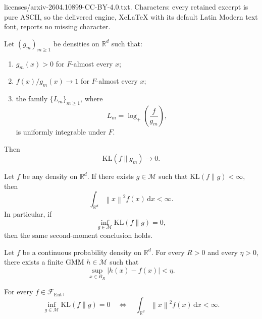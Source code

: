 \documentclass[10pt,a4paper]{amsart}
\begin{document}
licenses/arxiv-2604.10899-CC-BY-4.0.txt. Characters: every retained excerpt is pure ASCII, so the delivered engine, XeLaTeX with its default Latin Modern text font, reports no missing character.
\begin{proposition}
\label{prop:UIKL}
Let $(g_m)_{m\ge1}$ be densities on $\mathbb{R}^d$ such that:
\begin{enumerate}[label=\textnormal{(\roman*)}]
    \item $g_m(x)>0$ for $F$-almost every $x$;
    \item $f(x)/g_m(x)\to1$ for $F$-almost every $x$;
    \item the family $\{L_m\}_{m\ge1}$, where
    \[
    L_m=\log_+\!\left(\frac{f}{g_m}\right),
    \]
    is uniformly integrable under $F$.
\end{enumerate}
Then
\[
\mathrm{KL}(f\|g_m)\to0.
\]
\end{proposition}

\begin{theorem}
\label{thm:necessity}
Let $f$ be any density on $\mathbb{R}^d$. If there exists $g\in\mathcal M$ such that $\mathrm{KL}(f\|g)<\infty$, then
\[
\int_{\mathbb{R}^d}\left\lVert x \right\rVert^2 f(x)\,\mathrm{d}x<\infty.
\]
In particular, if
\[
\inf_{g\in\mathcal M}\mathrm{KL}(f\|g)=0,
\]
then the same second-moment conclusion holds.
\end{theorem}

\begin{lemma}
\label{lem:compactapprox}
Let $f$ be a continuous probability density on $\mathbb{R}^d$. For every $R>0$ and every $\eta>0$, there exists a finite GMM $h\in\mathcal M$ such that
\[
\sup_{x\in B_R} |h(x)-f(x)|<\eta.
\]
\end{lemma}

\begin{theorem}
\label{thm:entclass-UI}
For every $f\in\mathcal F_{\mathrm{Ent}}$,
\[
\inf_{g\in\mathcal M}\mathrm{KL}(f\|g)=0
\quad\Longleftrightarrow\quad
\int_{\mathbb{R}^d}\left\lVert x \right\rVert^2f(x)\,\mathrm{d}x<\infty.
\]
\end{theorem}
\end{document}
